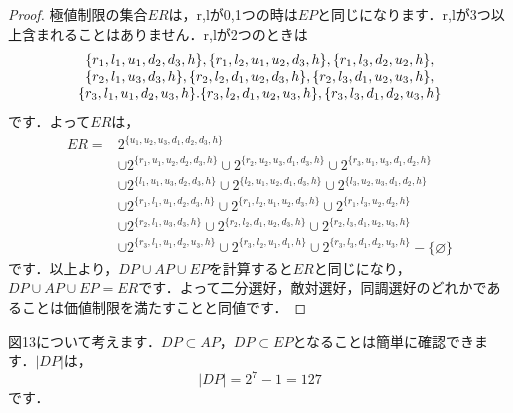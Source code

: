 \begin{proof}
極値制限の集合$ER$は，r,lが0,1つの時は$EP$と同じになります．r,lが3つ以上含まれることはありません．r,lが2つのときは
\begin{equation*}
    \begin{array}[h]{c}
        \{r_1,l_1,u_1,d_2,d_3,h\},
        \{r_1,l_2,u_1,u_2,d_3,h\},
        \{r_1,l_3,d_2,u_2,h\},     \\
        \{r_2,l_1,u_3,d_3,h\},
        \{r_2,l_2,d_1,u_2,d_3,h\},
        \{r_2,l_3,d_1,u_2,u_3,h\}, \\
        \{r_3,l_1,u_1,d_2,u_3,h\}.
        \{r_3,l_2,d_1,u_2,u_3,h\},
        \{r_3,l_3,d_1,d_2,u_3,h\}
    \end{array}
\end{equation*}
です．よって$ER$は，
\begin{align*}
ER = & 2^{\{u_1,u_2,u_3,d_1,d_2,d_3,h\}}\\
     & \cup 2^{\{r_1,u_1,u_2,d_2,d_3,h\}}
       \cup 2^{\{r_2,u_2,u_3,d_1,d_3,h\}}
       \cup 2^{\{r_3,u_1,u_3,d_1,d_2,h\}}\\
     & \cup 2^{\{l_1,u_1,u_3,d_2,d_3,h\}}
       \cup 2^{\{l_2,u_1,u_2,d_1,d_3,h\}}
       \cup 2^{\{l_3,u_2,u_3,d_1,d_2,h\}}\\
     & \cup 2^{\{r_1,l_1,u_1,d_2,d_3,h\}}
       \cup 2^{\{r_1,l_2,u_1,u_2,d_3,h\}}
       \cup 2^{\{r_1,l_3,u_2,d_2,h\}}    \\
     & \cup 2^{\{r_2,l_1,u_3,d_3,h\}}
       \cup 2^{\{r_2,l_2,d_1,u_2,d_3,h\}}
       \cup 2^{\{r_2,l_3,d_1,u_2,u_3,h\}}\\
     & \cup 2^{\{r_3,l_1,u_1,d_2,u_3,h\}}
       \cup 2^{\{r_3,l_2,u_1,d_1,h\}}
       \cup 2^{\{r_3,l_3,d_1,d_2,u_3,h\}}
       - \{\varnothing\}
\end{align*}
です．以上より，$DP \cup AP \cup EP$を計算すると$ER$と同じになり，$DP \cup AP \cup EP = ER$です．よって二分選好，敵対選好，同調選好のどれかであることは価値制限を満たすことと同値です．
\end{proof}

図13について考えます．$DP \subset AP$，$DP \subset EP$となることは簡単に確認できます．$|DP|$は，
\begin{equation*}
    |DP| = 2^7 - 1 = 127
\end{equation*}
です．

